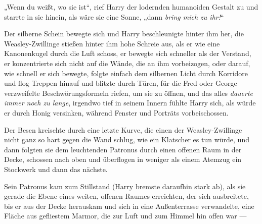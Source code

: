 „Wenn du weißt, wo sie ist“, rief Harry der lodernden humanoiden Gestalt zu und starrte in sie hinein, als wäre sie eine Sonne, „dann \emph{bring mich zu ihr!}“

Der silberne Schein bewegte sich und Harry beschleunigte hinter ihm her, die Weasley-Zwillinge stießen hinter ihm hohe Schreie aus, als er wie eine Kanonenkugel durch die Luft schoss, er bewegte sich schneller als der Verstand, er konzentrierte sich nicht auf die Wände, die an ihm vorbeizogen, oder darauf, wie schnell er sich bewegte, folgte einfach dem silbernen Licht durch Korridore und flog Treppen hinauf und blitzte durch Türen, für die Fred oder George verzweifelte Beschwörungsformeln riefen, um sie zu öffnen, und das alles \emph{dauerte immer noch zu lange}, irgendwo tief in seinem Innern fühlte Harry sich, als würde er durch Honig versinken, während Fenster und Porträts vorbeischossen.

Der Besen kreischte durch eine letzte Kurve, die einen der Weasley-Zwillinge nicht ganz so hart gegen die Wand schlug, wie ein Klatscher es tun würde, und dann folgten sie dem leuchtenden Patronus durch einen offenen Raum in der Decke, schossen nach oben und überflogen in weniger als einem Atemzug ein Stockwerk und dann das nächste.

Sein Patronus kam zum Stillstand (Harry bremste daraufhin stark ab), als sie gerade die Ebene eines weiten, offenen Raumes erreichten, der sich ausbreitete, bis er aus der Decke herauskam und sich in eine Außenterrasse verwandelte, eine Fläche aus gefliestem Marmor, die zur Luft und zum Himmel hin offen war —

